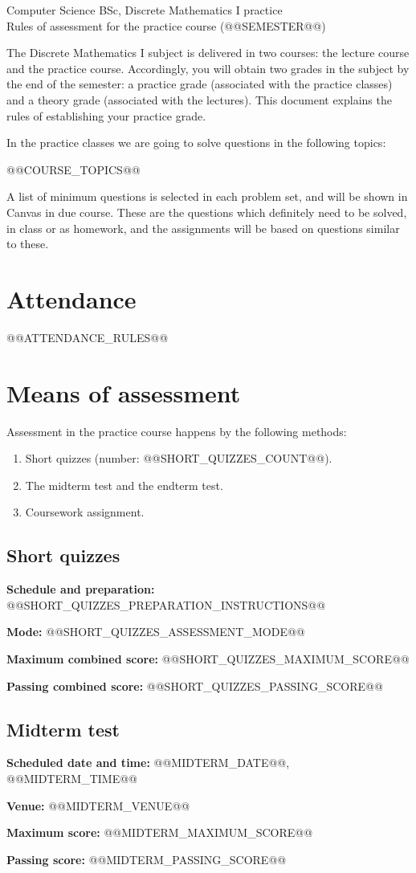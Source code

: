 \documentclass[11pt,a4paper]{article}
\newcommand{\field}[2]{\textbf{#1:} #2\par}
\begin{document}
\begin{center}\large
Computer Science BSc, Discrete Mathematics I practice\\
Rules of assessment for the practice course (@@SEMESTER@@)
\end{center}
The Discrete Mathematics I subject is delivered in two courses: the lecture
course and the practice course. Accordingly, you will obtain two grades in the
subject by the end of the semester: a practice grade (associated with the practice
classes) and a theory grade (associated with the lectures). This document explains
the rules of establishing your practice grade.

In the practice classes we are going to solve questions in the following topics:
\par @@COURSE_TOPICS@@

A list of minimum questions is selected in each problem set, and will be shown in
Canvas in due course. These are the questions which definitely need to be solved,
in class or as homework, and the assignments will be based on questions similar to these.

\section*{Attendance}
@@ATTENDANCE_RULES@@

\section*{Means of assessment}
Assessment in the practice course happens by the following methods:
\begin{enumerate}
\item Short quizzes (number: @@SHORT_QUIZZES_COUNT@@).
\item The midterm test and the endterm test.
\item Coursework assignment.
\end{enumerate}

\subsection*{Short quizzes}
\field{Schedule and preparation}{@@SHORT_QUIZZES_PREPARATION_INSTRUCTIONS@@}
\field{Mode}{@@SHORT_QUIZZES_ASSESSMENT_MODE@@}
\field{Maximum combined score}{@@SHORT_QUIZZES_MAXIMUM_SCORE@@}
\field{Passing combined score}{@@SHORT_QUIZZES_PASSING_SCORE@@}
\subsection*{Midterm test}
\field{Scheduled date and time}{@@MIDTERM_DATE@@, @@MIDTERM_TIME@@}
\field{Venue}{@@MIDTERM_VENUE@@}
\field{Maximum score}{@@MIDTERM_MAXIMUM_SCORE@@}
\field{Passing score}{@@MIDTERM_PASSING_SCORE@@}
\end{document}

